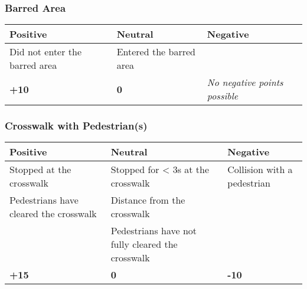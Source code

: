{\begin{highlight}
		\subsubsection*{Barred Area}
		\begin{table}[H]
			\begin{tabularx}{\textwidth}{XXX}
				\toprule
				\textbf{Positive}              & \textbf{Neutral}             & \textbf{Negative}                    \\
				\midrule
				Did not enter the barred area  & Entered the barred area      &                                      \\
				\topstrut
				\textbf{+10}                   & \textbf{0}                   & \textit{No negative points possible} \\
				\bottomrule
			\end{tabularx}
		\end{table}
	\end{highlight}

	\subsubsection*{Crosswalk with Pedestrian(s)}
	\begin{table}[H]
		\begin{tabularx}{\textwidth}{XXX}
			\toprule
			\textbf{Positive}                         & \textbf{Neutral}                                    & \textbf{Negative}           \\
			\midrule
			Stopped at the crosswalk                  & Stopped for < 3s at the crosswalk                   & Collision with a pedestrian \\
			Pedestrians have cleared the crosswalk    & Distance from the crosswalk                         &                             \\
			                                          & Pedestrians have not fully cleared the crosswalk    &                             \\
			\topstrut
			\textbf{+15}                              & \textbf{0}                                          & \textbf{-10}                \\
			\bottomrule
		\end{tabularx}
	\end{table}

}
